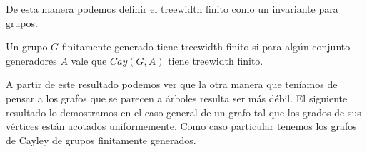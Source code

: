 \documentclass[tesis.tex]{subfiles}
\begin{document}
%	

De esta manera podemos definir el treewidth finito como un invariante para grupos.

\begin{deff}
	Un grupo $G$ finitamente generado tiene treewidth finito si para algún conjunto generadores $A$ vale que $Cay(G,A)$ tiene treewidth finito.
\end{deff}

A partir de este resultado podemos ver que la otra manera que teníamos de pensar a los grafos que se parecen a árboles resulta ser más débil. 
El siguiente resultado lo demostramos en el caso general de un grafo tal que los grados de sus vértices están acotados uniformemente. 
Como caso particular tenemos los grafos de Cayley de grupos finitamente generados.

%
\end{document}
